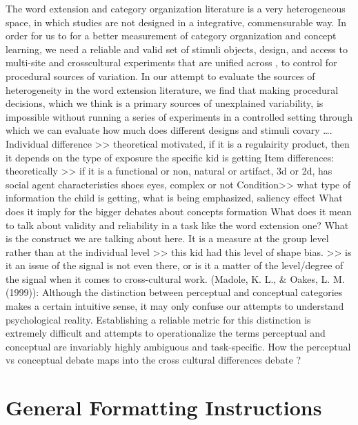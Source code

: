 \documentclass[10pt, letterpaper]{article}
\begin{document}
The word extension and category organization literature is a very
heterogeneous space, in which studies are not designed in a integrative,
commensurable way. In order for us to for a better measurement of
category organization and concept learning, we need a reliable and valid
set of stimuli objects, design, and access to multi-site and
crosscultural experiments that are unified across , to control for
procedural sources of variation. In our attempt to evaluate the sources
of heterogeneity in the word extension literature, we find that making
procedural decisions, which we think is a primary sources of unexplained
variability, is impossible without running a series of experiments in a
controlled setting through which we can evaluate how much does different
designs and stimuli covary \ldots. Individual difference
\textgreater\textgreater{} theoretical motivated, if it is a regulairity
product, then it depends on the type of exposure the specific kid is
getting Item differences: theoretically \textgreater\textgreater{} if it
is a functional or non, natural or artifact, 3d or 2d, has social agent
characteristics shoes eyes, complex or not
Condition\textgreater\textgreater{} what type of information the child
is getting, what is being emphasized, saliency effect What does it imply
for the bigger debates about concepts formation What does it mean to
talk about validity and reliability in a task like the word extension
one? What is the construct we are talking about here. It is a measure at
the group level rather than at the individual level
\textgreater\textgreater{} this kid had this level of shape bias.
\textgreater\textgreater{} is it an issue of the signal is not even
there, or is it a matter of the level/degree of the signal when it comes
to cross-cultural work. (Madole, K. L., \& Oakes, L. M. (1999)):
Although the distinction between perceptual and conceptual categories
makes a certain intuitive sense, it may only confuse our attempts to
understand psychological reality. Establishing a reliable metric for
this distinction is extremely difficult and attempts to operationalize
the terms perceptual and conceptual are invariably highly ambiguous and
task-specific. How the perceptual vs conceptual debate maps into the
cross cultural differences debate ?

\hypertarget{general-formatting-instructions}{%
\section{General Formatting
Instructions}\label{general-formatting-instructions}}
\end{document}
